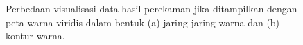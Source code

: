 \begin{figure}[t!]
	\centering
	\caption{Perbedaan visualisasi data hasil perekaman jika ditampilkan dengan peta warna viridis dalam bentuk (a) jaring-jaring warna dan (b) kontur warna.}
	\label{fig:mesh-kontur}
\end{figure}

